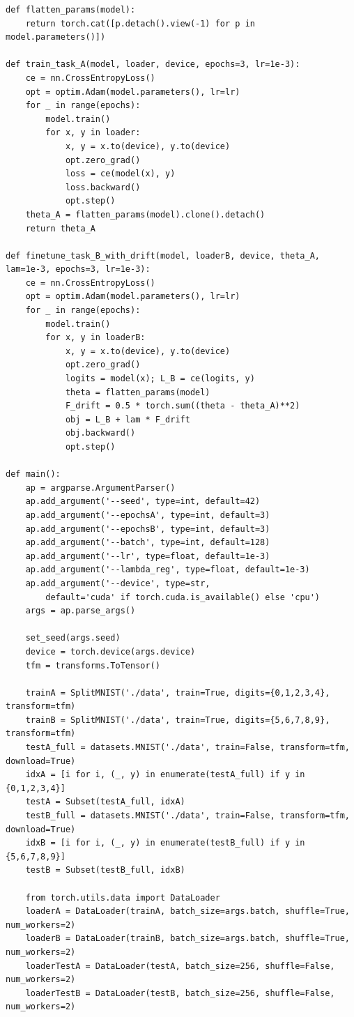 \documentclass[9pt,a4paper]{extarticle}
\begin{document}
\begin{lstlisting}
def flatten_params(model):
    return torch.cat([p.detach().view(-1) for p in model.parameters()])

def train_task_A(model, loader, device, epochs=3, lr=1e-3):
    ce = nn.CrossEntropyLoss()
    opt = optim.Adam(model.parameters(), lr=lr)
    for _ in range(epochs):
        model.train()
        for x, y in loader:
            x, y = x.to(device), y.to(device)
            opt.zero_grad()
            loss = ce(model(x), y)
            loss.backward()
            opt.step()
    theta_A = flatten_params(model).clone().detach()
    return theta_A

def finetune_task_B_with_drift(model, loaderB, device, theta_A, lam=1e-3, epochs=3, lr=1e-3):
    ce = nn.CrossEntropyLoss()
    opt = optim.Adam(model.parameters(), lr=lr)
    for _ in range(epochs):
        model.train()
        for x, y in loaderB:
            x, y = x.to(device), y.to(device)
            opt.zero_grad()
            logits = model(x); L_B = ce(logits, y)
            theta = flatten_params(model)
            F_drift = 0.5 * torch.sum((theta - theta_A)**2)
            obj = L_B + lam * F_drift
            obj.backward()
            opt.step()

def main():
    ap = argparse.ArgumentParser()
    ap.add_argument('--seed', type=int, default=42)
    ap.add_argument('--epochsA', type=int, default=3)
    ap.add_argument('--epochsB', type=int, default=3)
    ap.add_argument('--batch', type=int, default=128)
    ap.add_argument('--lr', type=float, default=1e-3)
    ap.add_argument('--lambda_reg', type=float, default=1e-3)
    ap.add_argument('--device', type=str,
        default='cuda' if torch.cuda.is_available() else 'cpu')
    args = ap.parse_args()

    set_seed(args.seed)
    device = torch.device(args.device)
    tfm = transforms.ToTensor()

    trainA = SplitMNIST('./data', train=True, digits={0,1,2,3,4}, transform=tfm)
    trainB = SplitMNIST('./data', train=True, digits={5,6,7,8,9}, transform=tfm)
    testA_full = datasets.MNIST('./data', train=False, transform=tfm, download=True)
    idxA = [i for i, (_, y) in enumerate(testA_full) if y in {0,1,2,3,4}]
    testA = Subset(testA_full, idxA)
    testB_full = datasets.MNIST('./data', train=False, transform=tfm, download=True)
    idxB = [i for i, (_, y) in enumerate(testB_full) if y in {5,6,7,8,9}]
    testB = Subset(testB_full, idxB)

    from torch.utils.data import DataLoader
    loaderA = DataLoader(trainA, batch_size=args.batch, shuffle=True, num_workers=2)
    loaderB = DataLoader(trainB, batch_size=args.batch, shuffle=True, num_workers=2)
    loaderTestA = DataLoader(testA, batch_size=256, shuffle=False, num_workers=2)
    loaderTestB = DataLoader(testB, batch_size=256, shuffle=False, num_workers=2)


\end{lstlisting}
\end{document}

